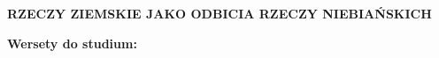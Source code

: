 \documentclass[10pt,a4paper,oneside]{article}
\begin{document}
\centerline{\textbf{\MakeUppercase{Rzeczy ziemskie jako odbicia rzeczy niebiańskich}}}
\begin{center}
\textbf{Wersety do studium:} 
\end{center}
\end{document}

